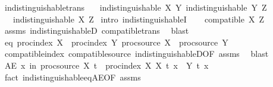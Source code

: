 \begin{isabellebody}
\endisatagproof
{\isafoldproof}%
%
\isadelimproof
\isanewline
%
\endisadelimproof
\isanewline
{}\isamarkupfalse%
\ indistinguishable{\isacharunderscore}{\kern0pt}trans{\isacharcolon}{\kern0pt}\isanewline
\ \ \ {\isachardoublequoteopen}indistinguishable\ X\ Y{\isachardoublequoteclose}\ {\isachardoublequoteopen}indistinguishable\ Y\ Z{\isachardoublequoteclose}\ \isanewline
\ \ \ {\isachardoublequoteopen}indistinguishable\ X\ Z{\isachardoublequoteclose}\isanewline
%
\isadelimproof
%
\endisadelimproof
%
\isatagproof
{}\isamarkupfalse%
\ {\isacharparenleft}{\kern0pt}intro\ indistinguishableI{\isacharparenright}{\kern0pt}\isanewline
\ \ \isamarkupfalse%
\ {\isachardoublequoteopen}compatible\ X\ Z{\isachardoublequoteclose}\isanewline
\ \ \ \ \isamarkupfalse%
\ assms\ indistinguishableD{\isacharparenleft}{\kern0pt}{}{\isacharparenright}{\kern0pt}\ compatible{\isacharunderscore}{\kern0pt}trans\ \isamarkupfalse%
\ blast\isanewline
\ \ \isamarkupfalse%
\ eq{\isacharcolon}{\kern0pt}\ {\isachardoublequoteopen}proc{\isacharunderscore}{\kern0pt}index\ X\ {\isacharequal}{\kern0pt}\ proc{\isacharunderscore}{\kern0pt}index\ Y{\isachardoublequoteclose}\ {\isachardoublequoteopen}proc{\isacharunderscore}{\kern0pt}source\ X\ {\isacharequal}{\kern0pt}\ proc{\isacharunderscore}{\kern0pt}source\ Y{\isachardoublequoteclose}\isanewline
\ \ \ \ \isamarkupfalse%
\ compatible{\isacharunderscore}{\kern0pt}index\ compatible{\isacharunderscore}{\kern0pt}source\ indistinguishableD{\isacharparenleft}{\kern0pt}{}{\isacharparenright}{\kern0pt}{\isacharbrackleft}{\kern0pt}OF\ assms{\isacharparenleft}{\kern0pt}{}{\isacharparenright}{\kern0pt}{\isacharbrackright}{\kern0pt}\ \isamarkupfalse%
\ blast{\isacharplus}{\kern0pt}\isanewline
\ \ \isamarkupfalse%
\ {\isachardoublequoteopen}AE\ x\ in\ proc{\isacharunderscore}{\kern0pt}source\ X{\isachardot}{\kern0pt}\ {\isasymforall}t\ {\isasymin}\ proc{\isacharunderscore}{\kern0pt}index\ X{\isachardot}{\kern0pt}\ X\ t\ x\ {\isacharequal}{\kern0pt}\ Y\ t\ x{\isachardoublequoteclose}\isanewline
\ \ \ \ \isamarkupfalse%
\ {\isacharparenleft}{\kern0pt}fact\ indistinguishable{\isacharunderscore}{\kern0pt}eq{\isacharunderscore}{\kern0pt}AE{\isacharbrackleft}{\kern0pt}OF\ assms{\isacharparenleft}{\kern0pt}{}{\isacharparenright}{\kern0pt}{\isacharbrackright}{\kern0pt}{\isacharparenright}{\kern0pt}\isanewline
\ \ \isamarkupfalse%

\end{isabellebody}
